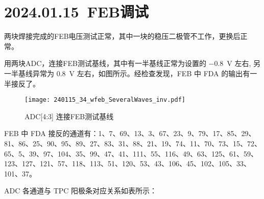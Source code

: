 \section{2024.01.15~FEB调试}
两块焊接完成的FEB电压测试正常，其中一块的稳压二极管不工作，更换后正常。\par
用两块ADC，连接FEB测试基线，其中有一半基线正常为设置的 \SI{-0.8}{V} 左右, 另一半基线异常为 \SI{0.8}{V} 左右，如图所示。经检查发现，FEB 中 FDA 的输出有一半接反了。\par
\begin{figure}[!htbp]
  \centering
  \texttt{[image: 240115\_34\_wfeb\_SeveralWaves\_inv.pdf]}
  \caption{ADC[4:3] 连接FEB测试基线}
  \label{fig:adc34_wfeb1}
\end{figure}
FEB 中 FDA 接反的通道有：1、7、69、13、3、67、23、9、79、17、85、29、81、86、25、90、95、89、27、83、31、88、21、19、74、11、70、73、15、72、65、5、39、97、104、35、99、47、41、111、55、116、49、63、125、61、59、123、127、121、57、118、113、51、120、53、43、106、45、102、105、33、101、37。\par
ADC 各通道与 TPC 阳极条对应关系如表所示：
